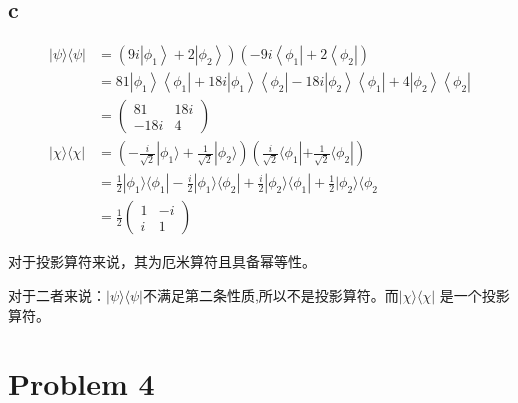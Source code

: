 \documentclass[dvipsnames, svgnames,a4paper,11pt]{article}
\begin{document}
\subsection{c}
$$\begin{aligned}
|\psi\rangle \langle\psi|& =(9i\left|\phi_1\right\rangle+2\left|\phi_2\right\rangle)(-9i\left\langle\phi_1\right|+2\left\langle\phi_2\right|) \\
&=81\left|\phi_1\right\rangle\left\langle\phi_1\right|+18i\left|\phi_1\right\rangle\left\langle\phi_2\right|-18i\left|\phi_2\right\rangle\left\langle\phi_1\right|+4\left|\phi_2\right\rangle\left\langle\phi_2\right| \\
&=\begin{pmatrix}81&18i\\-18i&4\end{pmatrix} \\
|\chi\rangle \langle\chi|& =(-\frac{i}{\sqrt{2}} |\phi_{1}\rangle+\frac{1}{\sqrt{2}} |\phi_{2}\rangle)(\frac{i}{\sqrt{2}} \langle\phi_{1}|+\frac{1}{\sqrt{2}} \langle\phi_{2}|) \\
&=\frac{1}{2} |\phi_{1}\rangle \langle\phi_{1}|-\frac{i}{2} |\phi_{1}\rangle \langle\phi_{2}|+\frac{i}{2} |\phi_{2}\rangle \langle\phi_{1}|+\frac{1}{2} |\phi_{2}\rangle \langle\phi_{2} \\
&=\frac{1}{2}\begin{pmatrix}1&-i\\i&1\end{pmatrix}
\end{aligned}$$

对于投影算符来说，其为厄米算符且具备幂等性。

对于二者来说：$|\psi\rangle\langle\psi|$不满足第二条性质,所以不是投影算符。而$|\chi\rangle\langle\chi|$ 是一个投影算符。

\section{Problem 4}
\end{document}
